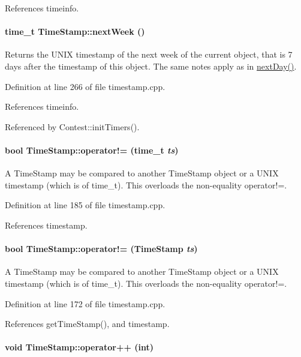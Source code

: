 References timeinfo.\hypertarget{classTimeStamp_TimeStampa18}{
\paragraph[nextWeek]{\setlength{\rightskip}{0pt plus 5cm}time\_\-t Time\-Stamp::next\-Week ()}\hfill}
\label{classTimeStamp_TimeStampa18}


Returns the UNIX timestamp of the next week of the current object, that is 7 days after the timestamp of this object. The same notes apply as in \hyperlink{classTimeStamp_TimeStampa16}{next\-Day()}. 

Definition at line 266 of file timestamp.cpp.

References timeinfo.

Referenced by Contest::init\-Timers().\hypertarget{classTimeStamp_TimeStampa13}{
\paragraph[operator"!=]{\setlength{\rightskip}{0pt plus 5cm}bool Time\-Stamp::operator!= (time\_\-t {\em ts})}\hfill}
\label{classTimeStamp_TimeStampa13}


A Time\-Stamp may be compared to another Time\-Stamp object or a UNIX timestamp (which is of time\_\-t). This overloads the non-equality operator!=. 

Definition at line 185 of file timestamp.cpp.

References timestamp.\hypertarget{classTimeStamp_TimeStampa12}{
\paragraph[operator"!=]{\setlength{\rightskip}{0pt plus 5cm}bool Time\-Stamp::operator!= (Time\-Stamp {\em ts})}\hfill}
\label{classTimeStamp_TimeStampa12}


A Time\-Stamp may be compared to another Time\-Stamp object or a UNIX timestamp (which is of time\_\-t). This overloads the non-equality operator!=. 

Definition at line 172 of file timestamp.cpp.

References get\-Time\-Stamp(), and timestamp.\hypertarget{classTimeStamp_TimeStampa5}{
\paragraph[operator++]{\setlength{\rightskip}{0pt plus 5cm}void Time\-Stamp::operator++ (int)}\hfill}
\label{classTimeStamp_TimeStampa5}


